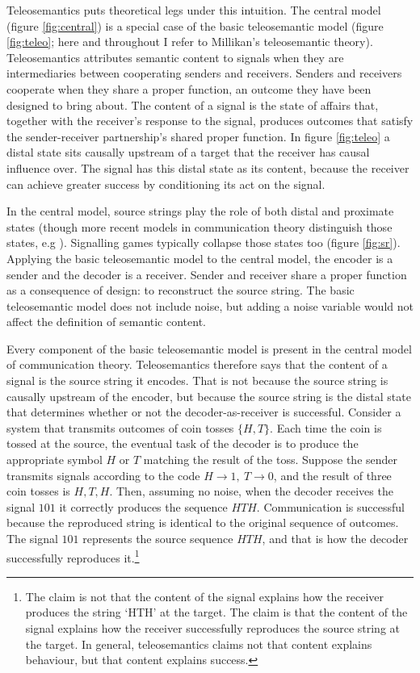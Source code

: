 Teleosemantics puts theoretical legs under this intuition.
The central model (figure \ref{fig:central}) is a special case of the basic teleosemantic model (figure \ref{fig:teleo}; here and throughout I refer to Millikan's \parencite*[$\S$6]{millikan2004varieties} teleosemantic theory).
Teleosemantics attributes semantic content to signals when they are intermediaries between cooperating senders and receivers.
Senders and receivers cooperate when they share a proper function, an outcome they have been designed to bring about.
The content of a signal is the state of affairs that, together with the receiver's response to the signal, produces outcomes that satisfy the sender-receiver partnership's shared proper function.
In figure \ref{fig:teleo} a distal state sits causally upstream of a target that the receiver has causal influence over.
The signal has this distal state as its content, because the receiver can achieve greater success by conditioning its act on the signal.



In the central model, source strings play the role of both distal and proximate states (though more recent models in communication theory distinguish those states, e.g \citet{berger1996ceo}).
Signalling games typically collapse those states too (figure \ref{fig:sr}).
Applying the basic teleosemantic model to the central model, the encoder is a sender and the decoder is a receiver.
Sender and receiver share a proper function as a consequence of design: to reconstruct the source string.
The basic teleosemantic model does not include noise, but adding a noise variable would not affect the definition of semantic content.



Every component of the basic teleosemantic model is present in the central model of communication theory.
Teleosemantics therefore says that the content of a signal is the source string it encodes.
That is not because the source string is causally upstream of the encoder, but because the source string is the distal state that determines whether or not the decoder-as-receiver is successful.
Consider a system that transmits outcomes of coin tosses $\{H,T\}$.
Each time the coin is tossed at the source, the eventual task of the decoder is to produce the appropriate symbol $H$ or $T$ matching the result of the toss.
Suppose the sender transmits signals according to the code $H\rightarrow1,\ T\rightarrow0$, and the result of three coin tosses is $H, T, H$.
Then, assuming no noise, when the decoder receives the signal $101$ it correctly produces the sequence $HTH$.
Communication is successful because the reproduced string is identical to the original sequence of outcomes.
The signal $101$ represents the source sequence $HTH$, and that is how the decoder successfully reproduces it.\footnote{The claim is not that the content of the signal explains how the receiver produces the string `HTH' at the target. The claim is that the content of the signal explains how the receiver successfully reproduces the source string at the target. In general, teleosemantics claims not that content explains behaviour, but that content explains success.}

